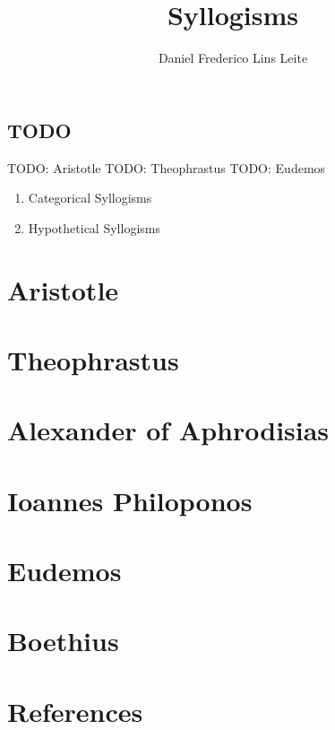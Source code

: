 \documentclass[10pt,a4paper]{book}
\author{Daniel Frederico Lins Leite}
\title{Syllogisms}
\begin{document}
	
	\maketitle
	
	\section{TODO}
	
	TODO: Aristotle
	TODO: Theophrastus
	TODO: Eudemos
	
		
	\begin{enumerate}
		\item Categorical Syllogisms
		\item Hypothetical Syllogisms
	\end{enumerate}

	\chapter{Aristotle}
	\chapter{Theophrastus}
	\chapter{Alexander of Aphrodisias}
	\chapter{Ioannes Philoponos}
	\chapter{Eudemos}	
	\chapter{Boethius}	

	\chapter{References}
	
\end{document}
